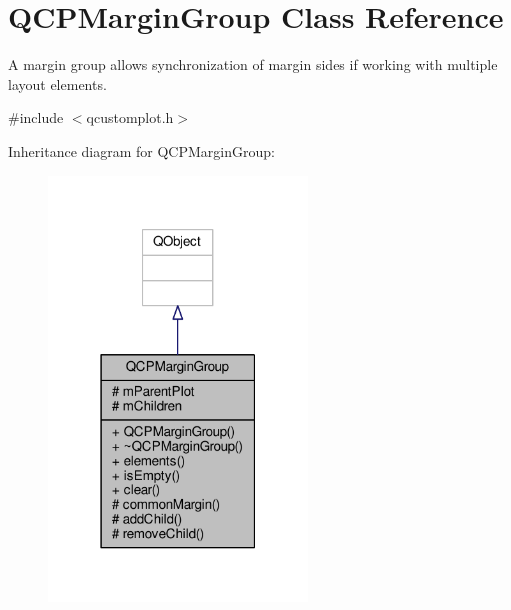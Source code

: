 \hypertarget{class_q_c_p_margin_group}{}\section{Q\+C\+P\+Margin\+Group Class Reference}
\label{class_q_c_p_margin_group}


A margin group allows synchronization of margin sides if working with multiple layout elements.  




{\ttfamily \#include $<$qcustomplot.\+h$>$}



Inheritance diagram for Q\+C\+P\+Margin\+Group\+:\nopagebreak
\begin{figure}[H]
\begin{center}
\leavevmode
\includegraphics[width=195pt]{class_q_c_p_margin_group__inherit__graph}
\end{center}
\end{figure}


